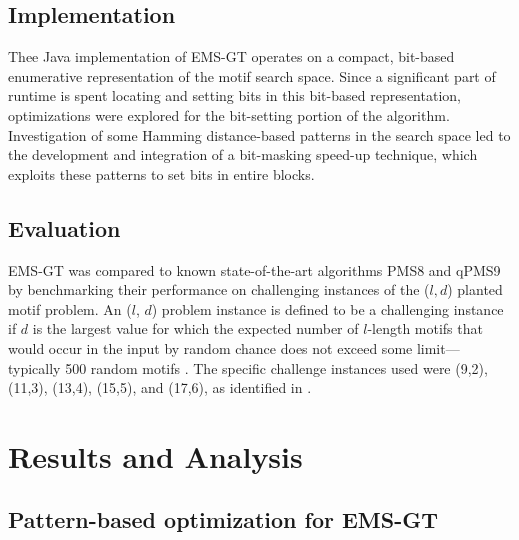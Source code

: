 \documentclass[oneside,12pt]{DISCSthesis}
\begin{document}
{	\section{Implementation}
		Thee Java implementation of EMS-GT operates on a compact, bit-based enumerative representation of the motif search space. 
		Since a significant part of runtime is spent locating and setting bits in this bit-based representation, optimizations were explored for the bit-setting portion of the algorithm. Investigation of some Hamming distance-based patterns in the search space led to the development and integration of a bit-masking speed-up technique, which exploits these patterns to set bits in entire blocks.

	\section{Evaluation}
		EMS-GT was compared to known state-of-the-art algorithms PMS8 and qPMS9 by benchmarking their performance on challenging instances of the 
		($l, d$) planted motif problem. An ($l$, $d$) problem instance is defined to be a challenging instance if $d$ is the largest value for which the expected number of $l$-length motifs that would occur in the input by random chance does not exceed some limit---typically 500 random motifs \cite{pms2015}. The specific challenge instances used were (9,2), (11,3), (13,4), (15,5), and (17,6), as identified in \cite{pms2015,pms2007}. 
		\bigskip

\chapter{Results and Analysis}
	\section{Pattern-based optimization for EMS-GT}
	
		}
\end{document}
